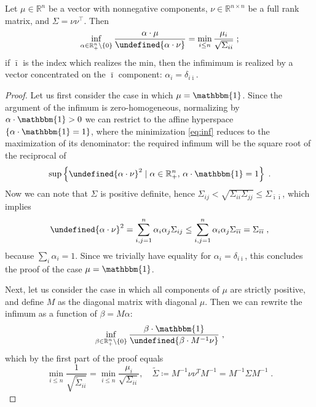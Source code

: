 \documentclass[runningheads]{m2ef}
\newcommand{\tr}[1]{{#1}^{\intercal}} %
\let\norm\undefined %
\DeclarePairedDelimiter\norm{\lVert}{\rVert}
\begin{document}
\begin{lemma}
	Let $\mu \in \mathbb{R}^n$ be a vector with nonnegative components, $\nu \in \mathbb{R}^{n\times n}$ be a full rank matrix, and $\Sigma = \nu \tr{\nu}$. Then
	\begin{equation}\label{eq:inf}
		\inf_{\alpha \in \mathbb{R}_{+}^n \setminus \{0\}} \frac{\alpha \cdot \mu}{\norm{\alpha \cdot \nu}} = \min_{i\leq n} \frac{\mu_i}{\sqrt{\Sigma_{ii}}} \; ;
	\end{equation}
	if $\bar{\imath}$ is the index which realizes the min, then the infimimum is realized by a vector concentrated on the $\bar{\imath}$ component: $\alpha_i = \delta_{i\bar{\imath}}$. 
\end{lemma}
\begin{proof}
	Let us first consider the case in which $\mu = \mathbbm{1}$. Since the argument of the infimum is zero-homogeneous, normalizing by $\alpha \cdot \mathbbm{1} > 0$ we can restrict to the affine hyperspace $\{\alpha \cdot \mathbbm{1} = 1\}$, where the minimization \eqref{eq:inf} reduces to the maximization of its denominator: the required infimum will be the square root of the reciprocal of
	\begin{equation}
	\sup\left\{\norm{\alpha \cdot \nu}^2 \mid \alpha \in \mathbb{R}_{+}^n,\, \alpha \cdot \mathbbm{1} = 1\right\} \; .
	\end{equation}
	Now we can note that $\Sigma$ is positive definite, hence $\Sigma_{ij} < \sqrt{\Sigma_{ii}\Sigma_{jj}} \leq \Sigma_{\bar{\imath}\bar{\imath}}$, which implies
	\begin{equation}
	\norm{\alpha \cdot \nu}^2 = \sum_{i,j=1}^{n} \alpha_i \alpha_j \Sigma_{ij} \leq \sum_{i,j=1}^{n} \alpha_i \alpha_j \Sigma_{\bar{\imath}\bar{\imath}} = \Sigma_{\bar{\imath}\bar{\imath}} \; ,
	\end{equation}
	because $\sum_i \alpha_i = 1$. Since we trivially have equality for $\alpha_i = \delta_{i\bar{\imath}}$, this concludes the proof of the case $\mu = \mathbbm{1}$.
	
	Next, let us consider the case in which all components of $\mu$ are strictly positive, and define $M$ as the diagonal matrix with diagonal $\mu$. Then we can rewrite the infimum as a function of $\beta = M\alpha$:
	\begin{equation}
	\inf_{\beta \in \mathbb{R}_{+}^n \setminus \{0\}} \frac{\beta \cdot \mathbbm{1}}{\norm{\beta \cdot M^{-1}\nu}} \; ,
	\end{equation}
	which by the first part of the proof equals 
	\begin{equation}
	\min_{i \leq n} \frac{1}{\sqrt{\tilde{\Sigma}_{ii}}} = \min_{i \leq n} \frac{\mu_i}{\sqrt{\Sigma_{ii}}}, \quad \tilde{\Sigma} \coloneqq M^{-1}\nu\nu^{T} M^{-1} = M^{-1}\Sigma M^{-1} \; .
	\end{equation}
	

\end{proof}
\end{document}
